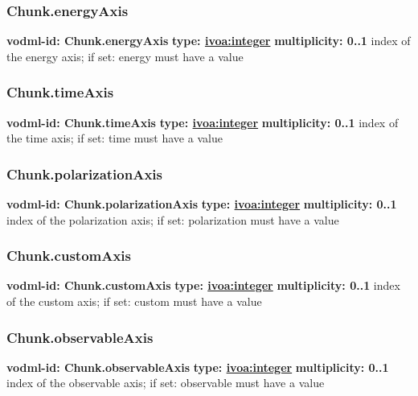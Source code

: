     \subsubsection{Chunk.energyAxis}
      \textbf{vodml-id: Chunk.energyAxis} \newline
      \textbf{type: \hyperref[sect:ivoa]{ivoa:integer}} \newline
      \textbf{multiplicity: 0..1} \newline
      index of the energy axis; if set: energy must have a value

    \subsubsection{Chunk.timeAxis}
      \textbf{vodml-id: Chunk.timeAxis} \newline
      \textbf{type: \hyperref[sect:ivoa]{ivoa:integer}} \newline
      \textbf{multiplicity: 0..1} \newline
      index of the time axis; if set: time must have a value

    \subsubsection{Chunk.polarizationAxis}
      \textbf{vodml-id: Chunk.polarizationAxis} \newline
      \textbf{type: \hyperref[sect:ivoa]{ivoa:integer}} \newline
      \textbf{multiplicity: 0..1} \newline
      index of the polarization axis; if set: polarization must have a value

    \subsubsection{Chunk.customAxis}
      \textbf{vodml-id: Chunk.customAxis} \newline
      \textbf{type: \hyperref[sect:ivoa]{ivoa:integer}} \newline
      \textbf{multiplicity: 0..1} \newline
      index of the custom axis; if set: custom must have a value

    \subsubsection{Chunk.observableAxis}
      \textbf{vodml-id: Chunk.observableAxis} \newline
      \textbf{type: \hyperref[sect:ivoa]{ivoa:integer}} \newline
      \textbf{multiplicity: 0..1} \newline
      index of the observable axis; if set: observable must have a value

